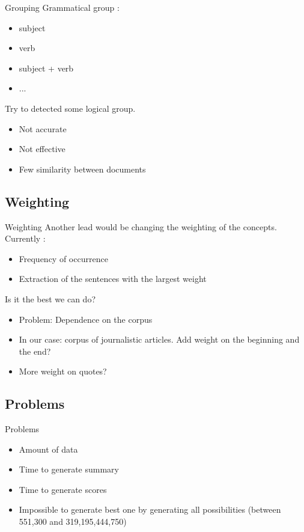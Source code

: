 \documentclass[xcolor=x11names,compress]{beamer}
\renewcommand{\(}{\begin{columns}}
\renewcommand{\)}{\end{columns}}
\newcommand{\<}[1]{\begin{column}{#1}}
\renewcommand{\>}{\end{column}}
\begin{document}
\begin{frame}{Grouping}
Grammatical group :
\begin{itemize}
\item subject
\item verb
\item subject + verb
\item ...
\end{itemize}
Try to detected some logical group.
\begin{itemize}
\item Not accurate
\item Not effective
\item Few similarity between documents
\end{itemize}
\end{frame}

\subsection{Weighting}
\begin{frame}{Weighting}
Another lead would be changing the weighting of the concepts.
Currently :
\begin{itemize}
\item Frequency of occurrence
\item Extraction of the sentences with the largest weight
\end{itemize}
Is it the best we can do?
\begin{itemize}
\item Problem: Dependence on the corpus
\item In our case: corpus of journalistic articles. Add weight on the beginning and the end?
\item More weight on quotes?
\end{itemize}
\end{frame}

\subsection{Problems}
\begin{frame}{Problems}
\begin{itemize}
\item Amount of data
\item Time to generate summary
\item Time to generate scores
\item Impossible to generate best one by generating all possibilities (between 551,300 and 319,195,444,750)
\end{itemize}
\end{frame}
\end{document}
